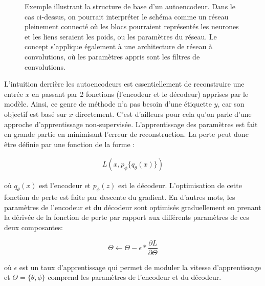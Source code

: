 \begin{figure}[h]
	\caption{Exemple illustrant la structure de base d'un autoencodeur. Dans le cas ci-dessus, on pourrait interpréter le schéma comme un réseau pleinement connecté où les blocs pourraient représentés les neurones et les liens seraient les poids, ou les paramètres du réseau. Le concept s'applique également à une architecture de réseau à convolutions, où les paramètres appris sont les filtres de convolutions.}
	\label{fig:basicAE}
\end{figure}

L'intuition derrière les autoencodeurs est essentiellement de reconstruire une entrée $x$ en passant par 2  fonctions (l'encodeur et le décodeur) apprises par le modèle. Ainsi, ce genre de méthode n'a pas besoin d'une étiquette $y$, car son objectif est basé sur $x$ directement. C'est d'ailleurs pour cela qu'on parle d'une approche d'apprentissage non-supervisée. L'apprentissage des paramètres est fait en grande partie en minimisant l'erreur de reconstruction. La perte peut donc être définie par une fonction de la forme :

\begin{gather}  \label{eq:loss}
L(x, p_\phi{\{q_\theta(x)\}})
\end{gather}


\noindent où $q_{\theta}(x)$ est l'encodeur et $p_{\phi}(z)$ est le décodeur. L'optimisation de cette fonction de perte est faite par descente du gradient. En d'autres mots, les paramètres de l'encodeur et du décodeur sont optimisés graduellement en prenant la dérivée de la fonction de perte par rapport aux différents paramètres de ces deux composantes:


\begin{equation} \label{optim}
\Theta \leftarrow \Theta-\epsilon*\frac{\partial L}{\partial\Theta}
\end{equation}

\noindent où $\epsilon$ est un taux d'apprentissage qui permet de moduler la vitesse d'apprentissage et $\Theta = \{\theta, \phi\}$ comprend les paramètres de l'encodeur et du décodeur.


